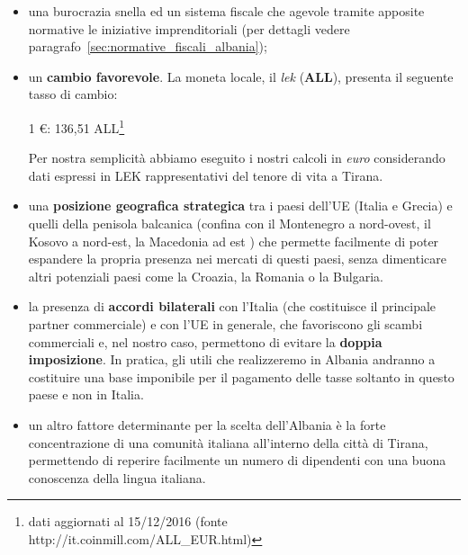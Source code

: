 \begin{itemize}
\item una burocrazia snella ed un sistema fiscale che agevole tramite apposite normative le iniziative imprenditoriali (per dettagli vedere paragrafo~\ref{sec:normative_fiscali_albania});
\item un \textbf{cambio favorevole}. La moneta locale, il \textit{lek} (\textbf{ALL}), presenta il seguente tasso di cambio:
	\begin{center}
		1 \euro : 136,51 ALL\footnote{dati aggiornati al 15/12/2016 (fonte http://it.coinmill.com/ALL\_EUR.html)}
	\end{center}
	
	\begin{tcolorbox}[colframe=blue!75!black,adjusted title=\textbf{Osservazione!}]
		Per nostra semplicità abbiamo eseguito i nostri calcoli in \textit{euro} considerando dati espressi in LEK rappresentativi del tenore di vita a Tirana.
	\end{tcolorbox}

\item una \textbf{posizione geografica strategica} tra i paesi dell'\ac{UE} (Italia e Grecia) e quelli della penisola balcanica (confina con il Montenegro a nord-ovest, il Kosovo a nord-est, la Macedonia ad est ) che permette facilmente di poter espandere la propria presenza nei mercati di questi paesi, senza dimenticare altri potenziali paesi come la Croazia, la Romania o la Bulgaria.
\item la presenza di \textbf{accordi bilaterali} con l'Italia (che costituisce il principale partner commerciale) e con l'\ac{UE} in generale, che favoriscono gli scambi commerciali e, nel nostro caso, permettono di evitare la \textbf{doppia imposizione}\cite{accordialbaniaitalia}. In pratica, gli utili che realizzeremo in Albania andranno a costituire una base imponibile per il pagamento delle tasse soltanto in questo paese e non in Italia.  
\item un altro fattore determinante per la scelta dell'Albania è la forte concentrazione di una comunità italiana all'interno della città di Tirana, permettendo di reperire facilmente un numero di dipendenti con una buona conoscenza della lingua italiana.
\end{itemize}  
